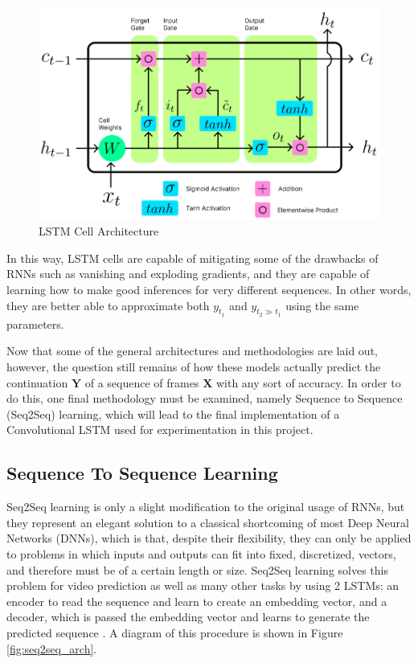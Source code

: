 \documentclass{scrartcl}
\begin{document}
\begin{figure}[H]
	\begin{center}
		\includegraphics[width=1\textwidth]{figures/lstmcell_arch.png}
	\end{center}
	\caption{LSTM Cell Architecture}
	\label{fig:lstmcell_arch}
\end{figure}

In this way, LSTM cells are capable of mitigating some of the drawbacks of RNNs
such as vanishing and exploding gradients, and they are capable of learning how
to make good inferences for very different sequences. In other words, they are
better able to approximate both $y_{t_1}$ and $y_{t_2 \gg t_1}$ using the same
parameters.

Now that some of the general architectures and methodologies are laid out,
however, the question still remains of how these models actually predict the
continuation $\boldsymbol{Y}$ of a sequence of frames $\boldsymbol{X}$ with any
sort of accuracy. In order to do this, one final methodology must be examined,
namely Sequence to Sequence (Seq2Seq) learning, which will lead to the final
implementation of a Convolutional LSTM used for experimentation in this
project.

\subsection{Sequence To Sequence Learning}
\label{subsec:seq2seq}

Seq2Seq learning is only a slight modification to the original usage of RNNs,
but they represent an elegant solution to a classical shortcoming of most Deep
Neural Networks (DNNs), which is that, despite their flexibility, they can only
be applied to problems in which inputs and outputs can fit into fixed,
discretized, vectors, and therefore must be of a certain length or size.
Seq2Seq learning solves this problem for video prediction as well as many other
tasks by using 2 LSTMs: an encoder to read the sequence and learn to create an
embedding vector, and a decoder, which is passed the embedding vector and
learns to generate the predicted sequence \cite{seq2seq_original}. A diagram of
this procedure is shown in Figure \ref{fig:seq2seq_arch}.
\end{document}
